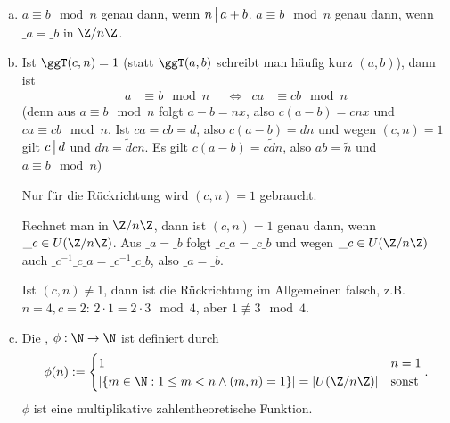 \begin{nt}
	\begin{enumerate}[a)]
		\item
			$a \equiv b \mod n$ genau dann, wenn $n \divs a + b$.
			$a \equiv b \mod n$ genau dann, wenn $\_a = \_b$ in $\Z / n\Z$.
		\item
			Ist $\ggT(c, n) = 1$ (statt $\ggT(a,b)$ schreibt man häufig kurz $(a,b)$), dann ist
			\begin{align*}
				a &\equiv b \mod n &
				&\iff&
				ca &\equiv cb \mod n
			\end{align*}
			(denn aus $a \equiv b \mod n$ folgt $a -b = n x$, also $c(a-b) = cnx$ und $ca \equiv cb \mod n$.
			Ist $ca = cb = d$, also $c(a-b) = dn$ und wegen $(c,n) = 1$ gilt $c\divs d$ und $dn = \tilde d c n$.
			Es gilt $c(a-b) = c \tilde d n$, also $ab = \tilde n$ und $a \equiv b \mod n$)

			Nur für die Rückrichtung wird $(c,n) = 1$ gebraucht.

			Rechnet man in $\Z / n \Z$, dann ist $(c,n) = 1$ genau dann, wenn $\_c \in U(\Z / n \Z)$.
			Aus $\_a = \_b$ folgt $\_c \_a = \_c \_b$ und wegen $\_c \in U(\Z / n\Z)$ auch $\_c^{-1} \_c \_a = \_c^{-1} \_c \_b$, also $\_a = \_b$.

			Ist $(c, n) \neq 1$, dann ist die Rückrichtung im Allgemeinen falsch, z.B. $n = 4, c = 2$: $2 \cdot 1 = 2 \cdot 3 \mod 4$, aber $1 \not\equiv 3 \mod 4$.
		\item
			Die , $\phi: \N \to \N$ ist definiert durch
			\[
				\phi(n) := \begin{cases}
					1 & n = 1 \\
					| \{m \in \N : 1 \le m < n \land (m,n) = 1 \} | = |U(\Z / n\Z)| & \text{sonst}
				\end{cases}.
			\]
			$\phi$ ist eine multiplikative zahlentheoretische Funktion.
	\end{enumerate}
\end{nt}


